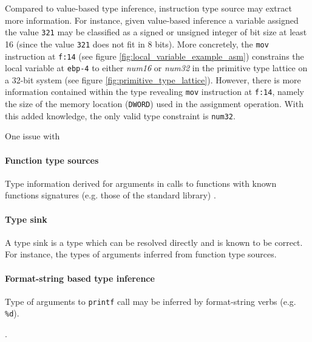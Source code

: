Compared to value-based type inference, instruction type source may extract more information. For instance, given value-based inference a variable assigned the value \texttt{321} may be classified as a signed or unsigned integer of bit size at least 16 (since the value \texttt{321} does not fit in 8 bits). More concretely, the \texttt{mov} instruction at \texttt{f:14} (see figure \ref{fig:local_variable_example_asm}) constrains the local variable at \texttt{ebp-4} to either \textit{num16} or \textit{num32} in the primitive type lattice on a 32-bit system (see figure \ref{fig:primitive_type_lattice}). However, there is more information contained within the type revealing \texttt{mov} instruction at \texttt{f:14}, namely the size of the memory location (\texttt{DWORD}) used in the assignment operation. With this added knowledge, the only valid type constraint is \texttt{num32}.

One issue with 


\paragraph{Function type sources}

Type information derived for arguments in calls to functions with known functions signatures (e.g. those of the standard library) \cite{type_inference_on_executables}.


\paragraph{Type sink}

A type sink is a type which can be resolved directly and is known to be correct. For instance, the types of arguments inferred from function type sources.


\paragraph{Format-string based type inference}


Type of arguments to \texttt{printf} call may be inferred by format-string verbs (e.g. \texttt{\%d}).

.
